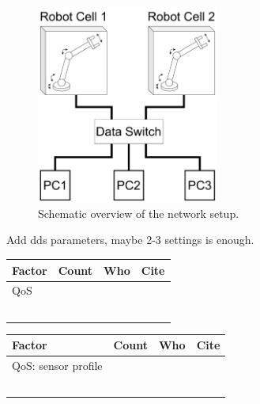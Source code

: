 \begin{figure}
\includegraphics[width=6cm]{Figures/c6/network_setup.pdf}
\caption{Schematic overview of the network setup.} \label{c6_fig_network}
\end{figure}
Add dds parameters, maybe 2-3 settings is enough.
\begin{table}[htbp]
\centering
\begin{tabular}{|l|l|l|l|}
    \hline
Factor & Count & Who & Cite \\\hline
   QoS &     &  &    \\\hline
       &     &   &   \\\hline
       &     &   &   \\\hline
       &     &   &   \\\hline
       &     &   &   \\\hline
       &     &   &   \\\hline
\end{tabular}
\end{table}

\begin{table}[htbp]
    \centering
\begin{tabular}{|l|l|l|l|}
    \hline
Factor & Count & Who & Cite \\\hline
   QoS: sensor profile     &     &  &    \\\hline
       &     &   &   \\\hline
       &     &   &   \\\hline
       &     &   &   \\\hline
       &     &   &   \\\hline
       &     &   &   \\\hline
       
\end{tabular}
\end{table}


